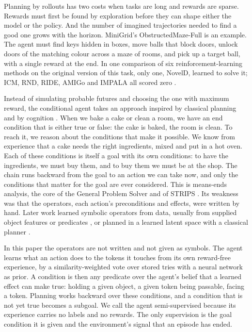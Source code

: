 \documentclass{article}
\begin{document}
Planning by rollouts has two costs when tasks are long and rewards are sparse. Rewards must first be found by exploration before they can shape either the model or the policy. And the number of imagined trajectories needed to find a good one grows with the horizon. MiniGrid's ObstructedMaze-Full \cite{ChevalierBoisvert2023} is an example. The agent must find keys hidden in boxes, move balls that block doors, unlock doors of the matching colour across a maze of rooms, and pick up a target ball, with a single reward at the end. In one comparison of six reinforcement-learning methods on the original version of this task, only one, NovelD, learned to solve it; ICM, RND, RIDE, AMIGo and IMPALA all scored zero \cite{Zhang2021}.

Instead of simulating probable futures and choosing the one with maximum reward, the conditional agent takes an approach inspired by classical planning and by cognition \cite{Lake2017}. When we bake a cake or clean a room, we have an end condition that is either true or false: the cake is baked, the room is clean. To reach it, we reason about the conditions that make it possible. We know from experience that a cake needs the right ingredients, mixed and put in a hot oven. Each of these conditions is itself a goal with its own conditions: to have the ingredients, we must buy them, and to buy them we must be at the shop. The chain runs backward from the goal to an action we can take now, and only the conditions that matter for the goal are ever considered. This is means-ends analysis, the core of the General Problem Solver and of STRIPS \cite{Newell1972,Fikes1971}. Its weakness was that the operators, each action's preconditions and effects, were written by hand. Later work learned symbolic operators from data, usually from supplied object features or predicates \cite{Pasula2007,Kansky2017,Silver2023}, or planned in a learned latent space with a classical planner \cite{Asai2018}.

In this paper the operators are not written and not given as symbols. The agent learns what an action does to the tokens it touches from its own reward-free experience, by a similarity-weighted vote over stored tries with a neural network as prior. A condition is then any predicate over the agent's belief that a learned effect can make true: holding a given object, a given token being passable, facing a token. Planning works backward over these conditions, and a condition that is not yet true becomes a subgoal. We call the agent semi-supervised because its experience carries no labels and no rewards. The only supervision is the goal condition it is given and the environment's signal that an episode has ended.
\end{document}
